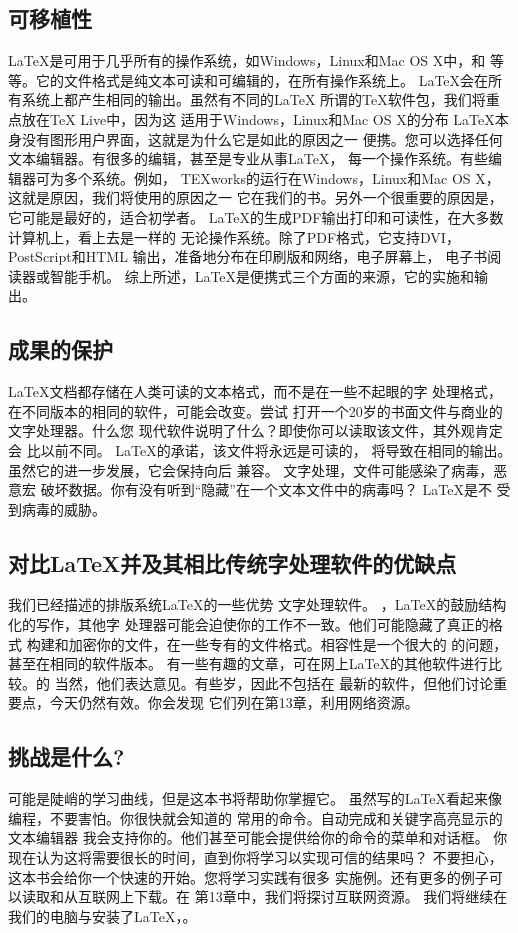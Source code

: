 	\subsection{可移植性}
	LaTeX是可用于几乎所有的操作系​​统，如Windows，Linux和Mac OS X中，和
	等等。它的文件格式是纯文本可读和可编辑的，在所有操作系统上。
	LaTeX会在所有系统上都产生相同的输出。虽然有不同的LaTeX
	所谓的TeX软件包，我们将重点放在TeX Live中，因为这
	适用于Windows，Linux和Mac OS X的分布
	LaTeX本身没有图形用户界面，这就是为什么它是如此的原因之一
	便携。您可以选择任何文本编辑器。有很多的编辑，甚至是专业从事LaTeX，
	每一个操作系统。有些编辑器可为多个系统。例如，
	TEXworks的运行在Windows，Linux和Mac OS X，这就是原因，我们将使用的原因之一
	它在我们的书。另外一个很重要的原因是，它可能是最好的，适合初学者。
	LaTeX的生成PDF输出打印和可读性，在大多数计算机上，看上去是一样的
	无论操作系统。除了PDF格式，它支持DVI，PostScript和HTML
	输出，准备地分布在印刷版和网络，电子屏幕上，
	电子书阅读器或智能手机。
	综上所述，LaTeX是便携式三个方面的来源，它的实施和输出。
	\subsection{成果的保护}
	LaTeX文档都存储在人类可读的文本格式，而不是在一些不起眼的字
	处理格式，在不同版本的相同的软件，可能会改变。尝试
	打开一个20岁的书面文件与商业的文字处理器。什么您
	现代软件说明了什么？即使你可以读取该文件，其外观肯定会
	比以前不同。 LaTeX的承诺，该文件将永远是可读的，
	将导致在相同的输出。虽然它的进一步发展，它会保持向后
	兼容。
	文字处理，文件可能感染了病毒，恶意宏
	破坏数据。你有没有听到“隐藏”在一个文本文件中的病毒吗？ LaTeX是不
	受到病毒的威胁。	

	\subsection{对比LaTeX并及其相比传统字处理软件的优缺点}
	我们已经描述的排版系统LaTeX的一些优势
	文字处理软件。 ，LaTeX的鼓励结构化的写作，其他字
	处理器可能会迫使你的工作不一致。他们可能隐藏了真正的格式
	构建和加密​​你的文件，在一些专有的文件格式。相容性是一个很大的
	的问题，甚至在相同的软件版本。
	有一些有趣的文章，可在网上LaTeX的其他软件进行比较。的
	当然，他们表达意见。有些岁，因此不包括在
	最新的软件，但他们讨论重要点，今天仍然有效。你会发现
	它们列在第13章，利用网络资源。
	\subsection{挑战是什么?}
	可能是陡峭的学习曲线，但是这本书将帮助你掌握它。
	虽然写的LaTeX看起来像编程，不要害怕。你很快就会知道的
	常用的命令。自动完成和关键字高亮显示的文本编辑器
	我会支持你的。他们甚至可能会提供给你的命令的菜单和对话框。
	你现在认为这将需要很长的时间，直到你将学习以实现可信的结果吗？
	不要担心，这本书会给你一个快速的开始。您将学习实践有很多
	实施例。还有更多的例子可以读取和从互联网上下载。在
	第13章中，我们将探讨互联网资源。
	我们将继续在我们的电脑与安装了LaTeX，。

